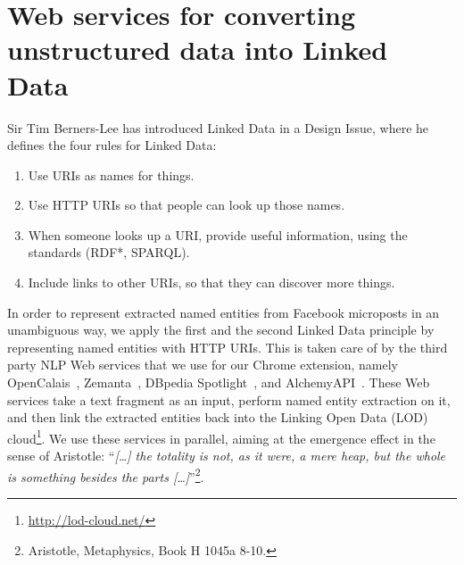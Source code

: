 \documentclass[conference]{IEEEtran}
\begin{document}
\section{Web services for converting unstructured data into Linked Data}    \label{sec:services}
Sir Tim Berners-Lee has introduced Linked Data\cite{TimBL:LinkedData} in a Design Issue, where he defines the four rules for Linked Data:
\begin{enumerate}
\item Use URIs as names for things.
\item Use HTTP URIs so that people can look up those names.
\item When someone looks up a URI, provide useful information, using the standards (RDF*, SPARQL).
\item Include links to other URIs, so that they can discover more things.
\end{enumerate}
In order to represent extracted named entities from Facebook microposts in an unambiguous way, we apply the first and the second Linked Data principle by representing named entities with HTTP URIs. This is taken care of by the third party NLP Web services that we use for our Chrome extension, namely OpenCalais~\cite{OpenCalais},
Zemanta~\cite{Zemanta}, DBpedia Spotlight~\cite{Spotlight}, and
AlchemyAPI~\cite{AlchemyApi}. These Web services take a text fragment as an input, perform named entity extraction on it, and then link the extracted entities back into the Linking Open Data (LOD) cloud\footnote{\url{http://lod-cloud.net/}}. We use these services in parallel, aiming at the emergence effect in the sense of Aristotle:
``\emph{[\ldots] the totality is not, as it were, a mere heap, but the whole is something besides the parts
[\ldots]}''\footnote{Aristotle, Metaphysics, Book H 1045a 8-10.}. 
\end{document}
